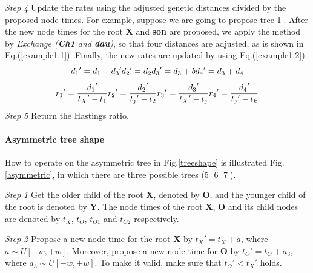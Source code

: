 \documentclass{bmcart}
\begin{document}
\emph{Step 4}  Update the rates using the adjusted genetic distances divided by the proposed node times. For example, suppose we are going to propose tree \textcircled1. After the new node times for the root \textbf{X} and \textbf{son} are proposed, we apply the method by \textit{Exchange (\textbf{Ch1} and \textbf{dau})}, so that four distances are adjusted, as is shown in Eq.(\ref{example1.1}). Finally, the new rates are updated by using Eq.(\ref{example1.2}).
\begin{equation}\label{example1.1}
{d_1}' = {d_1} - {d_3}'  \\
{d_2}' = {d_2} \\
{d_3}' = {d_3} + b \\
{d_4}' = {d_3} + {d_4}
\end{equation}
\begin{equation}\label{example1.2}
{r_1}' = \frac{{{d_1}'}}{{{t_X}' - {t_1}}} \\
{r_2}' = \frac{{{d_2}'}}{{{t_j}' - {t_2}}} \\
{r_3}' = \frac{{{d_3}'}}{{{t_X}' - {t_j}}} \\
{r_4}' = \frac{{{d_4}'}}{{{t_j}' - {t_k}}} 
\end{equation}
\emph{Step 5} Return the Hastings ratio.
\paragraph*{Asymmetric tree shape}

How to operate on the asymmetric tree in Fig.\ref{treeshape} is illustrated Fig.\ref{asymmetric}, in which there are three possible trees (\textcircled5 \textcircled6 \textcircled7).

\emph{Step 1} Get the older child of the root \textbf{X}, denoted by \textbf{O}, and the younger child of the root is denoted by \textbf{Y}. The node times of the root \textbf{X},  \textbf{O} and its child nodes are denoted by ${t_X}$, ${t_O}$, ${t_{O1}}$ and ${t_{O2}}$ respectively. 

\emph{Step 2} Propose a new node time for the root \textbf{X} by ${t_X}' = {t_X} + a$, where $a \sim U[ - w, + w]$. Moreover, propose a new node time for \textbf{O} by ${t_O}' = {t_O} + {a_3}$, where ${a_3} \sim U[ - w, + w]$. To make it valid, make sure that ${t_O}' < {t_X}'$ holds.  
\end{document}
